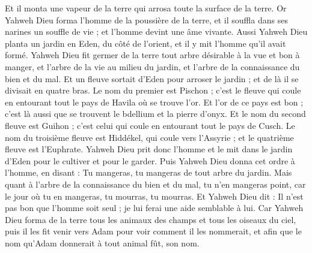 \begin{multicols}{2}
Et il monta une vapeur de la terre qui arrosa toute la surface de la terre.
Or Yahweh Dieu forma l'homme de la poussière de la terre, et il souffla dans ses narines un souffle de vie ; et l'homme devint une âme vivante.
Aussi Yahweh Dieu planta un jardin en Eden, du côté de l'orient, et il y mit l'homme qu'il avait formé.
Yahweh Dieu fit germer de la terre tout arbre désirable à la vue et bon à manger, et l'arbre de la vie au milieu du jardin, et l'arbre de la connaissance du bien et du mal.
Et un fleuve sortait d'Eden pour arroser le jardin ; et de là il se divisait en quatre bras.
Le nom du premier est Pischon ; c'est le fleuve qui coule en entourant tout le pays de Havila où se trouve l'or.
Et l'or de ce pays est bon ; c'est là aussi que se trouvent le bdellium et la pierre d'onyx.
Et le nom du second fleuve est Guihon ; c'est celui qui coule en entourant tout le pays de Cusch.
Le nom du troisième fleuve est Hiddékel, qui coule vers l'Assyrie ; et le quatrième fleuve est l'Euphrate.
Yahweh Dieu prit donc l'homme et le mit dans le jardin d'Eden pour le cultiver et pour le garder.
Puis Yahweh Dieu donna cet ordre à l'homme, en disant : Tu mangeras, tu mangeras de tout arbre du jardin.
Mais quant à l'arbre de la connaissance du bien et du mal, tu n'en mangeras point, car le jour où tu en mangeras, tu mourras, tu mourras.
Et Yahweh Dieu dit : Il n'est pas bon que l'homme soit seul ; je lui ferai une aide semblable à lui.
Car Yahweh Dieu forma de la terre tous les animaux des champs et tous les oiseaux du ciel, puis il les fit venir vers Adam pour voir comment il les nommerait, et afin que le nom qu'Adam donnerait à tout animal fût, son nom.

\end{multicols}
